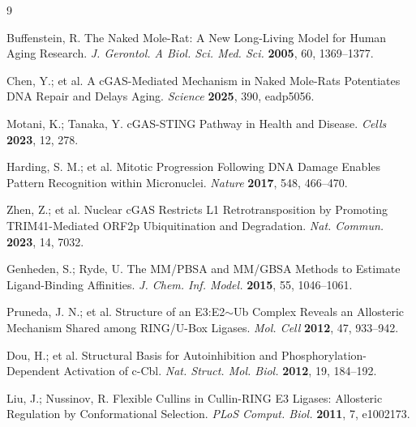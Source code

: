 \documentclass[journal=jcisd8, manuscript=article]{achemso}
\begin{document}
\begin{thebibliography}{9}

Buffenstein, R. The Naked Mole-Rat: A New Long-Living Model for Human Aging Research. \textit{J. Gerontol. A Biol. Sci. Med. Sci.} \textbf{2005}, 60, 1369--1377.

Chen, Y.; et al. A cGAS-Mediated Mechanism in Naked Mole-Rats Potentiates DNA Repair and Delays Aging. \textit{Science} \textbf{2025}, 390, eadp5056.

Motani, K.; Tanaka, Y. cGAS-STING Pathway in Health and Disease. \textit{Cells} \textbf{2023}, 12, 278.

Harding, S. M.; et al. Mitotic Progression Following DNA Damage Enables Pattern Recognition within Micronuclei. \textit{Nature} \textbf{2017}, 548, 466--470.

Zhen, Z.; et al. Nuclear cGAS Restricts L1 Retrotransposition by Promoting TRIM41-Mediated ORF2p Ubiquitination and Degradation. \textit{Nat. Commun.} \textbf{2023}, 14, 7032.

Genheden, S.; Ryde, U. The MM/PBSA and MM/GBSA Methods to Estimate Ligand-Binding Affinities. \textit{J. Chem. Inf. Model.} \textbf{2015}, 55, 1046--1061.

Pruneda, J. N.; et al. Structure of an E3:E2$\sim$Ub Complex Reveals an Allosteric Mechanism Shared among RING/U-Box Ligases. \textit{Mol. Cell} \textbf{2012}, 47, 933--942.

Dou, H.; et al. Structural Basis for Autoinhibition and Phosphorylation-Dependent Activation of c-Cbl. \textit{Nat. Struct. Mol. Biol.} \textbf{2012}, 19, 184--192.

Liu, J.; Nussinov, R. Flexible Cullins in Cullin-RING E3 Ligases: Allosteric Regulation by Conformational Selection. \textit{PLoS Comput. Biol.} \textbf{2011}, 7, e1002173.

\end{thebibliography}
\end{document}
